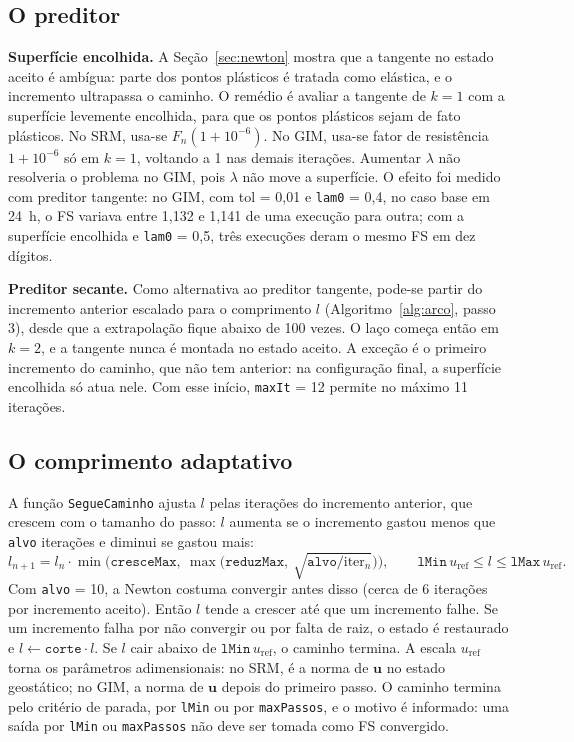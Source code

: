 \documentclass[11pt,a4paper]{article}
\numberwithin{equation}{section}
\begin{document}
\subsection{O preditor}\label{sec:preditor}

\textbf{Superfície encolhida.} A Seção~\ref{sec:newton} mostra que a tangente no estado aceito é ambígua: parte dos pontos plásticos é tratada como elástica, e o incremento ultrapassa o caminho. O remédio é avaliar a tangente de $k=1$ com a superfície levemente encolhida, para que os pontos plásticos sejam de fato plásticos. No SRM, usa-se $F_n(1+10^{-6})$. No GIM, usa-se fator de resistência $1+10^{-6}$ só em $k=1$, voltando a 1 nas demais iterações. Aumentar $\lambda$ não resolveria o problema no GIM, pois $\lambda$ não move a superfície. O efeito foi medido com preditor tangente: no GIM, com tol = 0,01 e \texttt{lam0} = 0,4, no caso base em 24~h, o FS variava entre 1,132 e 1,141 de uma execução para outra; com a superfície encolhida e \texttt{lam0} = 0,5, três execuções deram o mesmo FS em dez dígitos.

\textbf{Preditor secante.} Como alternativa ao preditor tangente, pode-se partir do incremento anterior escalado para o comprimento $l$ (Algoritmo~\ref{alg:arco}, passo 3), desde que a extrapolação fique abaixo de 100 vezes. O laço começa então em $k = 2$, e a tangente nunca é montada no estado aceito. A exceção é o primeiro incremento do caminho, que não tem anterior: na configuração final, a superfície encolhida só atua nele. Com esse início, \texttt{maxIt} = 12 permite no máximo 11 iterações.

\subsection{O comprimento adaptativo}\label{sec:adaptativo}

A função \texttt{SegueCaminho} ajusta $l$ pelas iterações do incremento anterior, que crescem com o tamanho do passo: $l$ aumenta se o incremento gastou menos que \texttt{alvo} iterações e diminui se gastou mais:
\begin{equation}
l_{n+1} = l_n\cdot\min\!\Big(\texttt{cresceMax},\ \max\big(\texttt{reduzMax},\ \sqrt{\texttt{alvo}/\mathrm{iter}_n}\big)\Big),
\qquad \texttt{lMin}\,u_{\mathrm{ref}} \le l \le \texttt{lMax}\,u_{\mathrm{ref}} .
\end{equation}
Com \texttt{alvo} = 10, a Newton costuma convergir antes disso (cerca de 6 iterações por incremento aceito). Então $l$ tende a crescer até que um incremento falhe. Se um incremento falha por não convergir ou por falta de raiz, o estado é restaurado e $l \leftarrow \texttt{corte}\cdot l$. Se $l$ cair abaixo de $\texttt{lMin}\,u_{\mathrm{ref}}$, o caminho termina. A escala $u_{\mathrm{ref}}$ torna os parâmetros adimensionais: no SRM, é a norma de $\mathbf{u}$ no estado geostático; no GIM, a norma de $\mathbf{u}$ depois do primeiro passo. O caminho termina pelo critério de parada, por \texttt{lMin} ou por \texttt{maxPassos}, e o motivo é informado: uma saída por \texttt{lMin} ou \texttt{maxPassos} não deve ser tomada como FS convergido.
\end{document}
